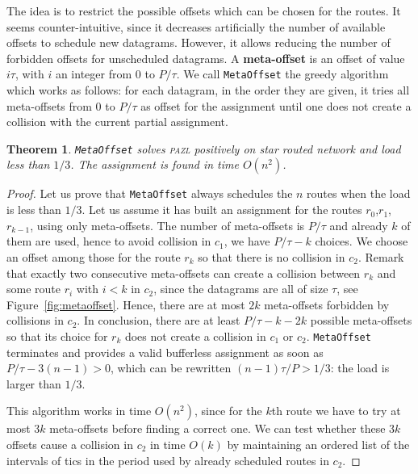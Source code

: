 \documentclass[a4paper,10pt]{journal}
\newcommand\metaoffset{\texttt{MetaOffset}\xspace}
\newtheorem{theorem}{Theorem}
\newcommand\pazl{\textsc{pazl}\xspace}
\begin{document}
     The idea is to restrict the possible offsets which can be chosen for the routes. It seems counter-intuitive, since it decreases artificially the number of available offsets to schedule new datagrams. However, it allows reducing the number of forbidden offsets for unscheduled datagrams. A \textbf{meta-offset} is an offset of value $i\tau$, with $i$ an integer from $0$ to $P / \tau$. We call \metaoffset the greedy algorithm which works as follows: for each datagram, in the order they are given, it tries all meta-offsets from $0$ to $P/\tau$ as offset for the assignment until one does not create a collision with the current partial assignment. 


\begin{theorem}
\metaoffset solves \pazl positively on star routed network and load less than $1/3$. 
The assignment is found in time $O(n^2)$.
\end{theorem}
    \begin{proof}
    Let us prove that \metaoffset always schedules the $n$ routes when the load is less than $1/3$. Let us assume it has built an assignment for the routes $r_0$,$r_1$, $r_{k-1}$, using only meta-offsets. The number of meta-offsets is $P/\tau$ and already $k$ of them are used, hence to avoid collision in $c_1$, we have $P/\tau - k$ choices. We choose an offset among those for the route $r_k$ so that there is no collision in $c_2$. Remark that exactly two consecutive meta-offsets can create a collision between $r_k$ and some route $r_i$ with $i < k$ in $c_2$, since the datagrams are all of size $\tau$, see Figure~\ref{fig:metaoffset}. Hence, there are at most $2k$ meta-offsets forbidden by collisions in $c_2$. In conclusion, there are at least $P/\tau - k - 2k$ possible meta-offsets so that its choice for $r_k$ does not create a collision in $c_1$ or $c_2$.  \metaoffset terminates and provides a valid bufferless assignment as soon as $P/\tau - 3(n-1) > 0$, which can be rewritten $(n-1)\tau /P > 1/3$: the load is larger than $1/3$.

     This algorithm works in time $O(n^2)$, since for the $k$th route we have to try at most $3k$ meta-offsets before finding a correct one. We can test whether these $3k$ offsets cause a collision in $c_2$ in time $O(k)$ by maintaining an ordered list of the intervals of tics in the period used by already scheduled routes in $c_2$.
     \end{proof}
         
\end{document}
